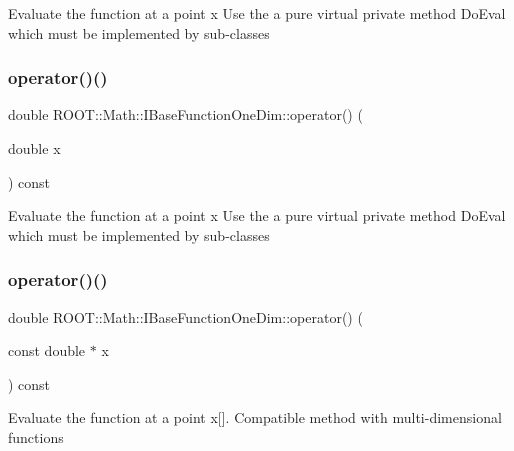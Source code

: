 Evaluate the function at a point x Use the a pure virtual private method Do\+Eval which must be implemented by sub-\/classes \mbox{\label{classROOT_1_1Math_1_1IBaseFunctionOneDim_ac7f3be3ec5ab92d04ebb33f6615d59c2}} 
\subsubsection{\texorpdfstring{operator()()}{operator()()}\hspace{0.1cm}{\footnotesize\ttfamily [3/6]}}
{\footnotesize\ttfamily double R\+O\+O\+T\+::\+Math\+::\+I\+Base\+Function\+One\+Dim\+::operator() (\begin{DoxyParamCaption}\item[{double}]{x }\end{DoxyParamCaption}) const\hspace{0.3cm}{\ttfamily [inline]}}

Evaluate the function at a point x Use the a pure virtual private method Do\+Eval which must be implemented by sub-\/classes \mbox{\label{classROOT_1_1Math_1_1IBaseFunctionOneDim_ab99decfcf98d9b016322ebe85f4bc77a}} 
\subsubsection{\texorpdfstring{operator()()}{operator()()}\hspace{0.1cm}{\footnotesize\ttfamily [4/6]}}
{\footnotesize\ttfamily double R\+O\+O\+T\+::\+Math\+::\+I\+Base\+Function\+One\+Dim\+::operator() (\begin{DoxyParamCaption}\item[{const double $\ast$}]{x }\end{DoxyParamCaption}) const\hspace{0.3cm}{\ttfamily [inline]}}

Evaluate the function at a point x\mbox{[}\mbox{]}. Compatible method with multi-\/dimensional functions \mbox{\label{classROOT_1_1Math_1_1IBaseFunctionOneDim_ab99decfcf98d9b016322ebe85f4bc77a}} 
